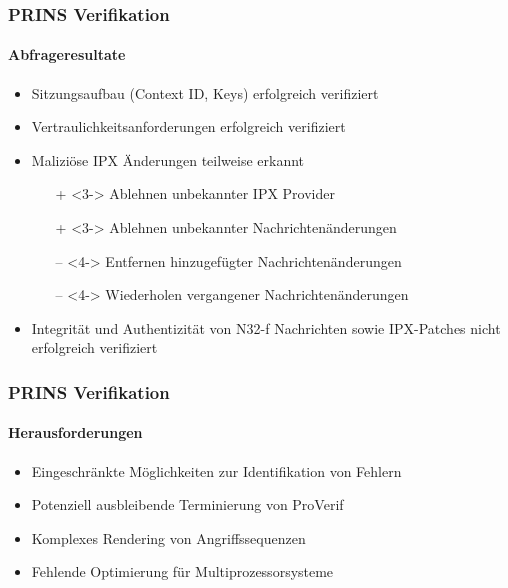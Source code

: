 \documentclass{beamer}
\begin{document}
\begin{frame}
    \frametitle{PRINS Verifikation}
    \framesubtitle{Abfrageresultate}

    \begin{itemize}
        \item<1-> Sitzungsaufbau (Context ID, Keys) erfolgreich verifiziert
        \vspace*{2mm}
        \item<2-> Vertraulichkeitsanforderungen erfolgreich verifiziert
        \vspace*{2mm}
        \item<3-> Maliziöse IPX Änderungen teilweise erkannt
        \begin{itemize}
            \item[+]<3-> Ablehnen unbekannter IPX Provider
            \item[+]<3-> Ablehnen unbekannter Nachrichtenänderungen
            \item[--]<4-> Entfernen hinzugefügter Nachrichtenänderungen
            \item[--]<4-> Wiederholen vergangener Nachrichtenänderungen
        \end{itemize}
        \vspace*{2mm}
        \item<5-> Integrität und Authentizität von N32-f Nachrichten sowie IPX-Patches nicht erfolgreich verifiziert
    \end{itemize}
\end{frame}

\begin{frame}
    \frametitle{PRINS Verifikation}
    \framesubtitle{Herausforderungen}

    \begin{itemize}
        \item<1-> Eingeschränkte Möglichkeiten zur Identifikation von Fehlern
        \vspace*{2mm}
        \item<2-> Potenziell ausbleibende Terminierung von ProVerif
        \vspace*{2mm}
        \item<3-> Komplexes Rendering von Angriffssequenzen
        \vspace*{2mm}
        \item<4-> Fehlende Optimierung für Multiprozessorsysteme
    \end{itemize}
\end{frame}
\end{document}
